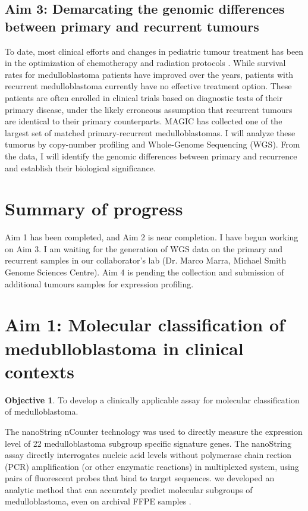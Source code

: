 \documentclass[11pt,letterpaper]{article}
\theoremstyle{definition}
\newtheorem*{objective}{Objective}
\begin{document}
\subsection{Aim 3: Demarcating the genomic differences between primary and recurrent tumours}

To date, most clinical efforts and changes in pediatric tumour treatment has been in the optimization of chemotherapy and radiation protocols . While survival rates for medulloblastoma patients have improved over the years, patients with recurrent medulloblastoma currently have no effective treatment option. These patients are often enrolled in clinical trials based on diagnostic tests of their primary disease, under the likely erroneous assumption that recurrent tumours are identical to their primary counterparts. MAGIC has collected one of the largest set of matched primary-recurrent medulloblastomas. I will analyze these tumorus by copy-number profiling and Whole-Genome Sequencing (WGS). From the data, I will identify the genomic differences between primary and recurrence and establish their biological significance.


\section{Summary of progress}

Aim 1 has been completed, and Aim 2 is near completion.
I have begun working on Aim 3. I am waiting for the generation of WGS data on the primary and recurrent samples in our collaborator's lab (Dr. Marco Marra, Michael Smith Genome Sciences Centre).
Aim 4 is pending the collection and submission of additional tumours samples for expression profiling.


\section{Aim 1: Molecular classification of medublloblastoma in clinical contexts}

\begin{objective}
To develop a clinically applicable assay for molecular classification of medulloblastoma.
\end{objective}

The nanoString nCounter technology  was used to directly measure the expression level of 22 medulloblastoma subgroup specific signature genes. The nanoString assay directly interrogates nucleic acid levels without polymerase chain rection (PCR) amplification (or other enzymatic reactions) in multiplexed system, using pairs of fluorescent probes that bind to target sequences. we developed an analytic method that can accurately predict molecular subgroups of medulloblastoma, even on archival FFPE samples .
\end{document}
